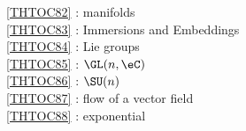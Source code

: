 \ref {THTOC82} : manifolds\\
\ref {THTOC83} : Immersions and Embeddings\\
\ref {THTOC84} : Lie groups\\
\ref {THTOC85} : \( \GL (n,\eC )\)\\
\ref {THTOC86} : \( \SU (n)\)\\
\ref {THTOC87} : flow of a vector field\\
\ref {THTOC88} : exponential\\
